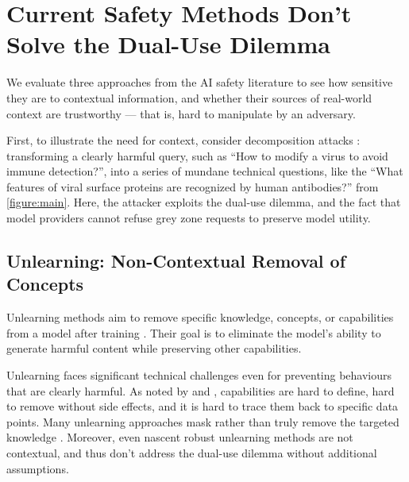 \documentclass{article}
\theoremstyle{plain}
\theoremstyle{definition}
\theoremstyle{remark}
\begin{document}
\section{Current Safety Methods Don't Solve the Dual-Use Dilemma}
\label{section:current-methods}

We evaluate three approaches from the AI safety literature to see how sensitive they are to contextual information, and whether their sources of real-world context are trustworthy --- that is, hard to manipulate by an adversary.


First, to illustrate the need for context, consider decomposition
attacks \cite{glukhov2023llmcensorshipmachinelearning,
glukhov2024breachthousandleaksunsafe}: transforming a clearly harmful
query, such as ``How to modify a virus to avoid immune detection?'',
into a series of mundane technical questions, like the ``What
features of viral surface proteins are recognized by human
antibodies?'' from \cref{figure:main}. Here, the attacker exploits
the dual-use dilemma, and the fact that model providers cannot refuse
grey zone requests to preserve model utility.

\subsection{Unlearning: Non-Contextual Removal of Concepts}

Unlearning methods aim to remove specific knowledge, concepts, or
capabilities from a model after training
\cite{liu2024rethinkingmachineunlearninglarge}. Their goal is to
eliminate the model's ability to generate harmful content while
preserving other capabilities.

Unlearning faces significant technical challenges even for preventing behaviours that are clearly harmful.
As noted by \citet{cooper2024machineunlearningdoesntthink} and \citet{barez2025openproblemsmachineunlearning}, capabilities are hard to define, hard to remove without side effects, and it is hard to trace them back to specific data points.
Many unlearning approaches mask rather than truly remove the targeted knowledge \cite{deeb2025unlearningmethodsremoveinformation}.
Moreover, even nascent robust unlearning methods \cite{cloud2024gradientroutingmaskinggradients,lee2025distillationrobustifiesunlearning} are not contextual, and thus don't address the dual-use dilemma without additional assumptions.
\end{document}
